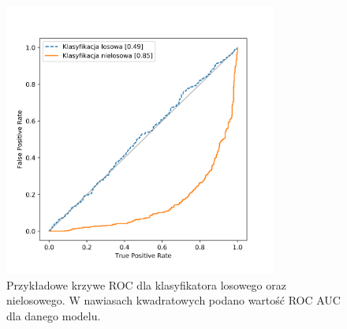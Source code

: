 \documentclass{pracalicmgr}
\begin{document}
	\begin{figure}[h]
	\centering
	\includegraphics[width=0.8\textwidth]{roc_example.png}
	\caption{Przykładowe krzywe ROC dla klasyfikatora losowego oraz nielosowego. W nawiasach kwadratowych podano wartość ROC AUC dla danego modelu.}
	\label{fig:roc}
	\end{figure}
	
\end{document}
